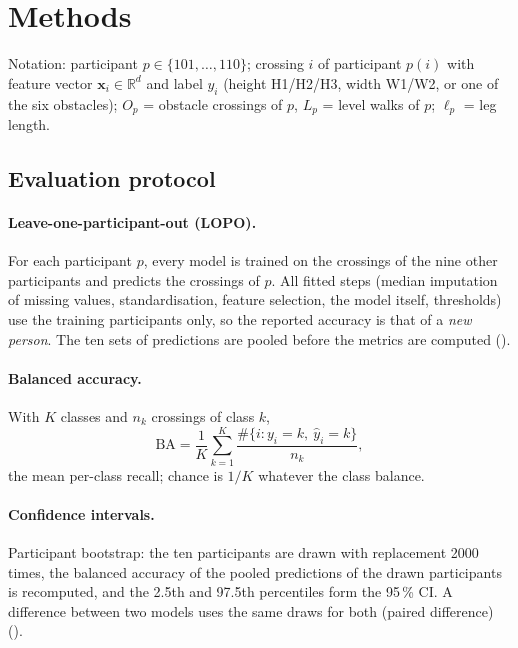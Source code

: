 \section{Methods}
\label{sec:methods}

Notation: participant $p \in \{101,\dots,110\}$; crossing $i$ of participant $p(i)$ with feature vector
$\mathbf{x}_i \in \mathbb{R}^d$ and label $y_i$ (height H1/H2/H3, width W1/W2, or one of the six obstacles);
$O_p$ = obstacle crossings of $p$, $L_p$ = level walks of $p$; $\ell_p$ = leg length.

\subsection{Evaluation protocol}
\label{sec:eval}

\paragraph{Leave-one-participant-out (LOPO).} For each participant $p$, every model is trained on the crossings of the nine
other participants and predicts the crossings of $p$. All fitted steps (median imputation of missing values, standardisation,
feature selection, the model itself, thresholds) use the training participants only, so the reported accuracy is that of
a \emph{new person}. The ten sets of predictions are pooled before the metrics are computed
().

\paragraph{Balanced accuracy.} With $K$ classes and $n_k$ crossings of class $k$,
\begin{equation}
\mathrm{BA} = \frac{1}{K}\sum_{k=1}^{K} \frac{\#\{i : y_i = k,\ \hat y_i = k\}}{n_k},
\end{equation}
the mean per-class recall; chance is $1/K$ whatever the class balance.

\paragraph{Confidence intervals.} Participant bootstrap: the ten participants are drawn with replacement 2000 times, the
balanced accuracy of the pooled predictions of the drawn participants is recomputed, and the 2.5th and 97.5th percentiles
form the 95\,\% CI. A difference between two models uses the same draws for both (paired difference)
().

